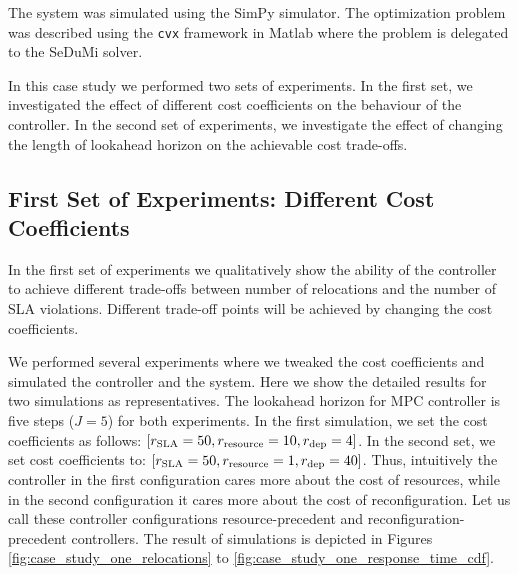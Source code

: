  The system was simulated using the SimPy \cite{Mueller2003SimPy} simulator. The optimization problem was described using the \texttt{cvx} framework \cite{cvx} in Matlab where the problem is delegated to the SeDuMi \cite{sturm1999using} solver.  

 In this case study we performed two sets of experiments. In the first set, we investigated the effect of different cost coefficients on the behaviour of the controller. In the second set of experiments, we investigate the effect of changing the length of lookahead horizon on the achievable cost trade-offs. 

\subsection{First Set of Experiments: Different Cost Coefficients}
In the first set of experiments we qualitatively show the ability of the controller to achieve different trade-offs between number of relocations and the number of SLA violations. Different trade-off points will be achieved by changing the cost coefficients. 

We performed several experiments where we tweaked the cost coefficients and simulated the controller and the system. Here we show the detailed results for two simulations as representatives.
The lookahead horizon for MPC controller is five steps ($J=5$) for both experiments. 
	In the first simulation, we set the cost coefficients as follows: $[r_{\text{SLA}}=50,  r_{\text{resource}}=10, r_{\text{dep}}=4]$. 
In the second set, we set cost coefficients to: $[r_{\text{SLA}}=50,  r_{\text{resource}}=1, r_{\text{dep}}=40]$. Thus, intuitively the controller in the first configuration cares more about the cost of resources, while in the second configuration it cares more about the cost of reconfiguration. Let us call these controller configurations resource-precedent and reconfiguration-precedent controllers.
The result of simulations is depicted in Figures \ref{fig:case_study_one_relocations}  to \ref{fig:case_study_one_response_time_cdf}.

